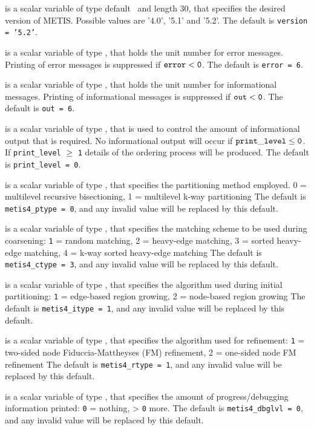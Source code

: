 \documentclass{galahad}
\begin{document}
\begin{description}

 is a scalar variable of type default \character\
and length 30, that specifies the desired version of METIS. Possible
values are '4.0', '5.1' and '5.2'.
The default is {\tt version = '5.2'}.

 is a scalar variable of type \integer, that holds the
unit number for error messages.
Printing of error messages is suppressed if ${\tt error} < {\tt 0}$.
The default is {\tt error = 6}.

 is a scalar variable of type \integer, that holds the
unit number for informational messages.
Printing of informational messages is suppressed if ${\tt out} < {\tt 0}$.
The default is {\tt out = 6}.

 is a scalar variable of type \integer,
that is used
to control the amount of informational output that is required. No
informational output will occur if ${\tt print\_level} \leq {\tt 0}$. If
{\tt print\_level} $\geq$ {\tt 1} details of the ordering process will 
be produced. The default is {\tt print\_level = 0}.

 is a scalar variable of type \integer, that specifies
the partitioning method employed. 0 = multilevel recursive bisectioning, 
 1 = multilevel k-way partitioning
The default is {\tt metis4\_ptype = 0}, and any invalid value will be
replaced by this default.

 is a scalar variable of type \integer, that specifies
the matching scheme to be used during coarsening: {\tt 1} = random matching, 
 2 = heavy-edge matching, 3 = sorted heavy-edge matching, 
 4 = k-way sorted heavy-edge matching
The default is {\tt metis4\_ctype = 3}, and any invalid value will be
replaced by this default.

 is a scalar variable of type \integer, that specifies
the algorithm used during initial partitioning: 
 {\tt 1} = edge-based region growing, 2 = node-based region growing
The default is {\tt metis4\_itype = 1}, and any invalid value will be
replaced by this default.

 is a scalar variable of type \integer, that specifies
the algorithm used for refinement: 
 {\tt 1} = two-sided node Fiduccia-Mattheyses (FM) refinement,
 2 = one-sided node FM refinement
The default is {\tt metis4\_rtype = 1}, and any invalid value will be
replaced by this default.

 is a scalar variable of type \integer, that specifies
the amount of progress/debugging information printed: {\tt 0} = nothing, > {\tt 0} more.
The default is {\tt metis4\_dbglvl = 0}, and any invalid value will be
replaced by this default.


\end{description}
\end{document}
